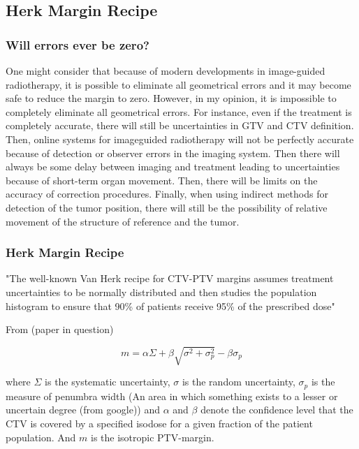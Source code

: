 \documentclass[11pt]{article}
\begin{document}
\subsection{Herk Margin Recipe} \label{term:herk-margin-recipe}

\subsubsection{Will errors ever be zero?}

One might consider that because of modern developments in image-guided radiotherapy, it is possible to eliminate all geometrical errors and it may become safe to reduce the margin to zero. However, in my opinion, it is impossible to completely eliminate all geometrical errors. For instance, even if the treatment is completely accurate, there will still be uncertainties in GTV and CTV definition. Then, online systems for imageguided radiotherapy will not be perfectly accurate because of detection or observer errors in the imaging system. Then there will always be some delay between imaging and treatment leading to uncertainties because of short-term organ movement. Then, there will be limits on the accuracy of correction procedures. Finally, when using indirect methods for detection of the tumor position, there will still be the possibility of relative movement of the structure of reference and the tumor. \cite{van-herk-margin-recipe}

\subsubsection{Herk Margin Recipe}

"The well-known Van Herk recipe for CTV-PTV margins \cite{van-herk-margin-recipe2} assumes treatment uncertainties to be normally distributed and then studies the population histogram to ensure that 90\% of patients receive 95\% of the prescribed dose" \cite{van-herk-margin-recipe3} \cite{van-herk-margin-recipe2}

From \cite{personalised-PTV-strategies} (paper in question)

\begin{equation}
    m = \alpha \Sigma + \beta \sqrt{\sigma^2 + \sigma^2_p} - \beta \sigma_p
\end{equation}

where $\Sigma$ is the systematic uncertainty, $\sigma$ is the random uncertainty, $\sigma_p$ is the measure of penumbra width (An area in which something exists to a lesser or uncertain degree (from google)) and $\alpha$ and $\beta$ denote the confidence level that the CTV is covered by a specified isodose for a given fraction of the patient population. And $m$ is the isotropic PTV-margin.
\end{document}
